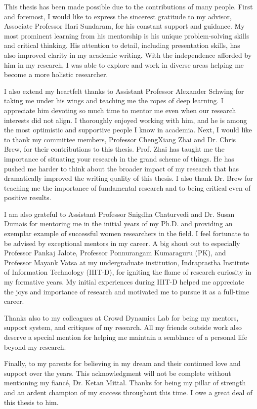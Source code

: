 This thesis has been made possible due to the contributions of many people.
First and foremost, I would like to express the sincerest gratitude to my advisor, Associate Professor Hari Sundaram, for his constant support and guidance.
My most prominent learning from his mentorship is his unique problem-solving skills and critical thinking.
His attention to detail, including presentation skills, has also improved clarity in my academic writing. With the independence afforded by him in my research, I was able to explore and work in diverse areas helping me become a more holistic researcher.

I also extend my heartfelt thanks to Assistant Professor Alexander Schwing for taking me under his wings and teaching me the ropes of deep learning. I appreciate him devoting so much time to mentor me even when our research interests did not align.
I thoroughly enjoyed working with him, and he is among the most optimistic and supportive people I know in academia.
Next, I would like to thank my committee members, Professor ChengXiang Zhai and Dr. Chris Brew, for their contributions to this thesis.
Prof. Zhai has taught me the importance of situating your research in the grand scheme of things. He has pushed me harder to think about the broader impact of my research that has dramatically improved the writing quality of this thesis. I also thank Dr. Brew for teaching me the importance of fundamental research and to being critical even of positive results.

I am also grateful to Assistant Professor Snigdha Chaturvedi and Dr. Susan Dumais for mentoring me in the initial years of my Ph.D. and providing an exemplar example of successful women researchers in the field. I feel fortunate to be advised by exceptional mentors in my career.
A big shout out to especially Professor Pankaj Jalote, Professor Ponnurangam Kumaraguru (PK), and Professor Mayank Vatsa at my undergraduate institution, Indraprastha Institute of Information Technology (IIIT-D), for igniting the flame of research curiosity in my formative years. My initial experiences during IIIT-D helped me appreciate the joys and importance of research and motivated me to pursue it as a full-time career.

Thanks also to my colleagues at Crowd Dynamics Lab for being my mentors, support system, and critiques of my research.
All my friends outside work also deserve a special mention for helping me maintain a semblance of a personal life beyond my research.

Finally, to my parents for believing in my dream and their continued love and support over the years. This acknowledgment will not be complete without mentioning my fianc\'e, Dr. Ketan Mittal. Thanks for being my pillar of strength and an ardent champion of my success throughout this time. I owe a great deal of this thesis to him.
